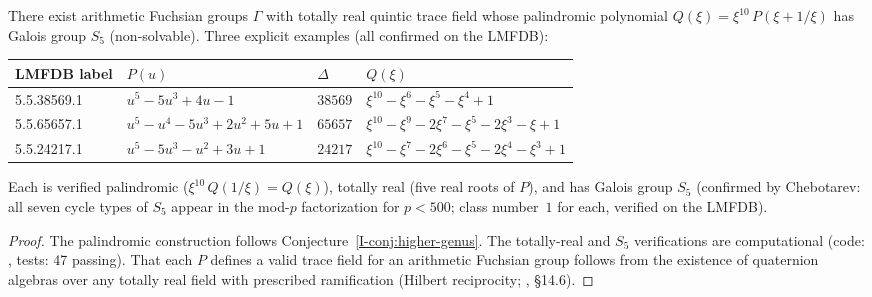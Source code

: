 \begin{proposition}
\label{prop:nonsolvable}
There exist arithmetic Fuchsian groups $\Gamma$ with totally
real quintic trace field whose palindromic polynomial
$Q(\xi) = \xi^{10}\,P(\xi + 1/\xi)$ has Galois group $S_5$
(non-solvable).  Three explicit examples (all confirmed on the LMFDB):
\begin{center}
\begin{tabular}{llll}
\toprule
LMFDB label & $P(u)$ & $\Delta$ & $Q(\xi)$ \\
\midrule
5.5.38569.1 & $u^5 {-} 5u^3 {+} 4u {-} 1$ & $38569$ &
  $\xi^{10} {-} \xi^6 {-} \xi^5 {-} \xi^4 {+} 1$ \\
5.5.65657.1 & $u^5 {-} u^4 {-} 5u^3 {+} 2u^2 {+} 5u {+} 1$ & $65657$ &
  $\xi^{10} {-} \xi^9 {-} 2\xi^7 {-} \xi^5 {-} 2\xi^3 {-} \xi {+} 1$ \\
5.5.24217.1 & $u^5 {-} 5u^3 {-} u^2 {+} 3u {+} 1$ & $24217$ &
  $\xi^{10} {-} \xi^7 {-} 2\xi^6 {-} \xi^5 {-} 2\xi^4 {-} \xi^3 {+} 1$ \\
\bottomrule
\end{tabular}
\end{center}
Each is verified palindromic
($\xi^{10}\,Q(1/\xi) = Q(\xi)$),
totally real (five real roots of $P$), and has Galois group
$S_5$ (confirmed by Chebotarev: all seven cycle types of $S_5$
appear in the mod-$p$ factorization for $p < 500$;
class number~$1$ for each, verified on the LMFDB).
\end{proposition}

\begin{proof}
The palindromic construction follows
Conjecture~\ref{I-conj:higher-genus}.
The totally-real and $S_5$ verifications are computational
(code: , tests: 47 passing).
That each $P$ defines a valid trace field for an arithmetic
Fuchsian group follows from the existence of quaternion
algebras over any totally real field with prescribed ramification
(Hilbert reciprocity; \citealt{Voight2021}, \S14.6).
\end{proof}

